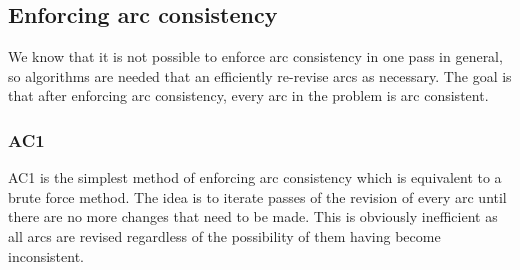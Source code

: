 \documentclass[CS4402-Notes.tex]{subfiles}
\begin{document}
\subsection{Enforcing arc consistency}
We know that it is not possible to enforce arc consistency in one pass in general, so algorithms are needed that an efficiently re-revise arcs as necessary. The goal is that after enforcing arc consistency, every arc in the problem is arc consistent. 

\subsubsection{AC1}
AC1 is the simplest method of enforcing arc consistency which is equivalent to a brute force method. The idea is to iterate passes of the revision of every arc until there are no more changes that need to be made. This is obviously inefficient as all arcs are revised regardless of the possibility of them having become inconsistent.
\end{document}
